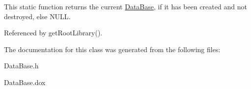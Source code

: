 This static function returns the current \hyperlink{classHurricane_1_1DataBase}{Data\+Base}, if it has been created and not destroyed, else {\ttfamily N\+U\+LL}. 

Referenced by get\+Root\+Library().



The documentation for this class was generated from the following files\+:\begin{DoxyCompactItemize}
\item 
Data\+Base.\+h\item 
Data\+Base.\+dox\end{DoxyCompactItemize}
